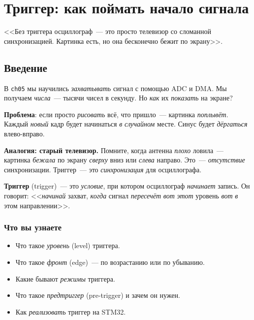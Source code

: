 
\chapter{Триггер: как поймать начало сигнала}
\label{ch:trigger}

\epigraph{<<Без триггера осциллограф~--- это просто телевизор
со сломанной синхронизацией. Картинка есть, но она
бесконечно бежит по экрану>>.}{}

\section{Введение}
\label{sec:trigger-intro}

В \texttt{ch05} мы научились \emph{захватывать} сигнал с
помощью ADC и DMA. Мы получаем \emph{числа}~--- тысячи
чисел в секунду. Но \emph{как} их \emph{показать}
на экране?

\textbf{Проблема}: если просто \emph{рисовать} всё, что
пришло~--- картинка \emph{поплывёт}. Каждый \emph{новый}
кадр будет начинаться \emph{в} \emph{случайном} месте.
Синус будет \emph{дёргаться} влево-вправо.

\begin{ideabox}
\textbf{Аналогия: старый телевизор.} Помните, когда
антенна \emph{плохо} ловила~--- картинка \emph{бежала}
по экрану \emph{сверху} вниз или \emph{слева} направо.
Это~--- \emph{отсутствие} синхронизации. Триггер~---
это \emph{синхронизация} для осциллографа.
\end{ideabox}

\textbf{Триггер} (trigger)~--- это \emph{условие}, при
котором осциллограф \emph{начинает} запись. Он говорит:
<<\emph{начинай} захват, \emph{когда} сигнал \emph{пересечёт}
\emph{вот} \emph{этот} уровень \emph{вот} \emph{в} этом
направлении>>.

\subsection{Что вы узнаете}

\begin{itemize}
    \item Что такое \emph{уровень} (level) триггера.
    \item Что такое \emph{фронт} (edge)~--- по возрастанию
          или по убыванию.
    \item Какие бывают \emph{режимы} триггера.
    \item Что такое \emph{предтриггер} (pre-trigger) и зачем он нужен.
    \item Как \emph{реализовать} триггер на STM32.
\end{itemize}

